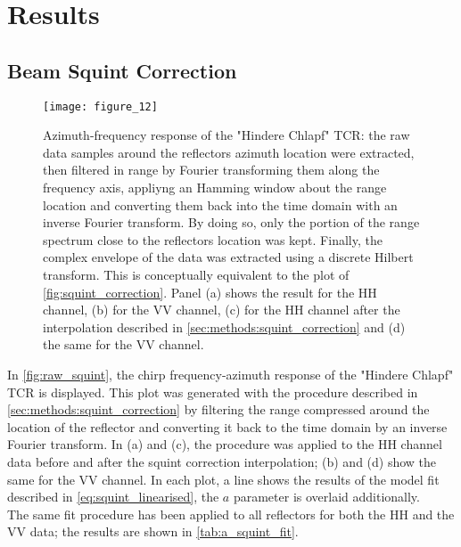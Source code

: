 \section{Results}\label{sec:results}
\subsection{Beam Squint Correction}\label{sec:results:squint_correction}
\begin{figure*}[ht]
	\centering
	\texttt{[image: figure\_12]}
	\caption{Azimuth-frequency response of the "Hindere Chlapf" TCR: the raw data samples around the reflectors azimuth location were extracted, then filtered in range by Fourier transforming them along the frequency axis, appliyng an Hamming window about the range location and converting them  back into the time domain with an inverse Fourier transform. By doing so, only the portion of the range spectrum close to the reflectors location was kept. Finally, the complex envelope of the data was extracted using a discrete Hilbert transform. This is conceptually equivalent to the plot of \autoref{fig:squint_correction}. Panel (a) shows the result for the HH channel, (b) for the VV channel, (c) for the HH channel after the interpolation described in \autoref{sec:methods:squint_correction}  and (d) the same for the VV channel.}
	\label{fig:raw_squint}
\end{figure*}
In \autoref{fig:raw_squint}, the chirp frequency-azimuth response of the "Hindere Chlapf" TCR is displayed. This plot was generated with the procedure described in \autoref{sec:methods:squint_correction} by filtering the range compressed around the location of the reflector and converting it back to the time domain by an inverse Fourier transform. In (a) and (c), the procedure was applied to the HH channel data before and after the squint correction interpolation; (b) and (d) show the same for the VV channel. In each plot, a line shows the results of the model fit described in \autoref{eq:squint_linearised}, the $a$ parameter is overlaid additionally.\\
The same fit procedure has been applied to all reflectors for both the HH and the VV data; the results are shown in \autoref{tab:a_squint_fit}.\\
